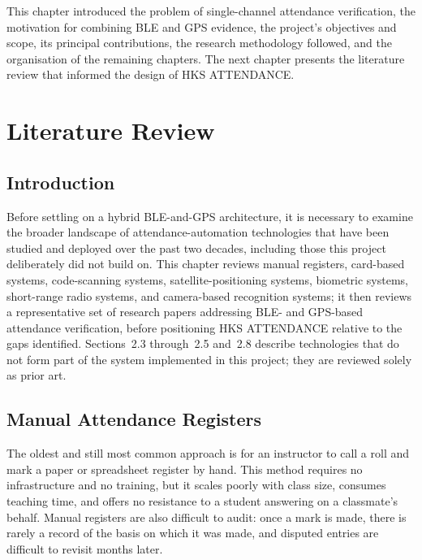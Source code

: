 \documentclass[12pt, a4paper, oneside]{report}
\begin{document}
This chapter introduced the problem of single-channel attendance verification, the motivation for combining BLE and GPS evidence, the project's objectives and scope, its principal contributions, the research methodology followed, and the organisation of the remaining chapters. The next chapter presents the literature review that informed the design of HKS ATTENDANCE.

\chapter{Literature Review}
\label{chap:literature}

\section{Introduction}

Before settling on a hybrid BLE-and-GPS architecture, it is necessary to examine the broader landscape of attendance-automation technologies that have been studied and deployed over the past two decades, including those this project deliberately did not build on. This chapter reviews manual registers, card-based systems, code-scanning systems, satellite-positioning systems, biometric systems, short-range radio systems, and camera-based recognition systems; it then reviews a representative set of research papers addressing BLE- and GPS-based attendance verification, before positioning HKS ATTENDANCE relative to the gaps identified. Sections~2.3 through~2.5 and~2.8 describe technologies that do not form part of the system implemented in this project; they are reviewed solely as prior art.

\section{Manual Attendance Registers}

The oldest and still most common approach is for an instructor to call a roll and mark a paper or spreadsheet register by hand. This method requires no infrastructure and no training, but it scales poorly with class size, consumes teaching time, and offers no resistance to a student answering on a classmate's behalf. Manual registers are also difficult to audit: once a mark is made, there is rarely a record of the basis on which it was made, and disputed entries are difficult to revisit months later.
\end{document}
